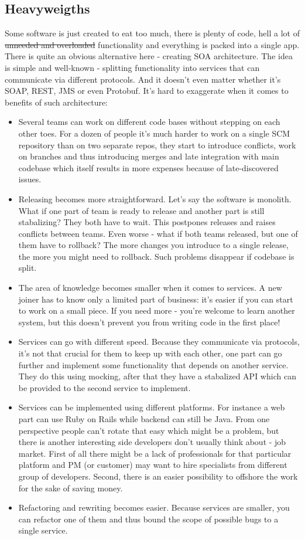 \documentclass[11pt,a4paper,oneside]{article}
\begin{document}
\subsection{Heavyweigths}
Some software is just created to eat too much, there is plenty of code, hell a lot of \sout{unneeded and overloaded} functionality and everything is packed into a single app. There is quite an obvious alternative here - creating SOA architecture. The idea is simple and well-known - splitting functionality into services that can communicate via different protocols. And it doesn't even matter whether it's SOAP, REST, JMS or even Protobuf. It's hard to exaggerate when it comes to benefits of such architecture:
\begin{itemize}
  \item Several teams can work on different code bases without stepping on each other toes. For a dozen of people it's much harder to work on a single SCM repository than on two separate repos, they start to introduce conflicts, work on branches and thus introducing merges and late integration with main codebase which itself results in more expenses because of late-discovered issues.
  \item Releasing becomes more straightforward. Let's say the software is monolith. What if one part of team is ready to release and another part is still stabalizing? They both have to wait. This postpones releases and raises conflicts between teams. Even worse - what if both teams released, but one of them have to rollback? The more changes you introduce to a single release, the more you might need to rollback. Such problems disappear if codebase is split.
  \item The area of knowledge becomes smaller when it comes to services. A new joiner has to know only a limited part of business: it's easier if you can start to work on a small piece. If you need more - you're welcome to learn another system, but this doesn't prevent you from writing code in the first place!
  \item Services can go with different speed. Because they communicate via protocols, it's not that crucial for them to keep up with each other, one part can go further and implement some functionality that depends on another service. They do this using mocking, after that they have a stabalized API which can be provided to the second service to implement.
  \item Services can be implemented using different platforms. For instance a web part can use Ruby on Rails while backend can still be Java. From one perspective people can't rotate that easy which might be a problem, but there is another interesting side developers don't usually think about - job market. First of all there might be a lack of professionals for that particular platform and PM (or customer) may want to hire specialists from different group of developers. Second, there is an easier possibility to offshore the work for the sake of saving money.
  \item Refactoring and rewriting becomes easier. Because services are smaller, you can refactor one of them and thus bound the scope of possible bugs to a single service.
\end{itemize}
\end{document}
